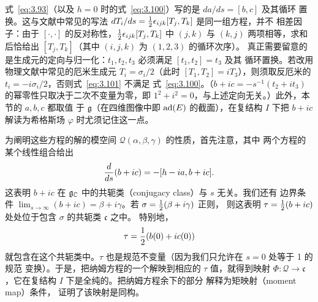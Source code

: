 \begin{yizhu}[易错点]
式~\eqref{eq:3.93}（以及 $h=0$ 时的式~\eqref{eq:3.100}）写的是 $da/ds=[b,c]$ 及其循环
置换。这与文献中常见的写法 $dT_i/ds=\frac{1}{2}\epsilon_{ijk}[T_j,T_k]$ 是同一组方程，并不
相差因子：由于 $[\cdot,\cdot]$ 的反对称性，$\frac{1}{2}\epsilon_{ijk}[T_j,T_k]$ 中 $(j,k)$ 与
$(k,j)$ 两项相等，求和后恰给出 $[T_j,T_k]$（其中 $(i,j,k)$ 为 $(1,2,3)$ 的循环次序）。
真正需要留意的是生成元的定向与归一化：$t_1,t_2,t_3$ 必须满足 $[t_1,t_2]=t_3$ 及其
循环置换。若改用物理文献中常见的厄米生成元 $T_i=\sigma_i/2$（此时
$[T_1,T_2]=iT_3$），则须取反厄米的 $t_i=-i\sigma_i/2$，否则式~\eqref{eq:3.101} 不满足
式~\eqref{eq:3.100}。（$b+ic=-s^{-1}(t_2+it_3)$ 的幂零性只取决于二次不变量为零，即
$1^2+i^2=0$，与上述定向无关。）此外，本节的 $a,b,c$ 都取值
于 $\mathfrak g$（在四维图像中即 ${\rm ad}(E)$ 的截面），在复结构 $I$ 下把 $b+ic$
解读为希格斯场 $\varphi$ 时尤须记住这一点。
\end{yizhu}

为阐明这些方程的解的模空间 ${\mathcal Q}(\alpha,\beta,\gamma)$ 的性质，首先注意，其中
两个方程的某个线性组合给出
\setcounter{equation}{93}
\begin{equation}\label{eq:3.94}
  {d\over ds}(b+ic)=-[h-ia,b+ic].
\end{equation}
这表明 $b+ic$ 在 $\mathfrak g_{\mathbb{C}}$ 中的共轭类（conjugacy class）与 $s$ 无关。我们还有
边界条件 $\lim_{s\to\infty}(b+ic)=\beta+i\gamma$。若 $\sigma=\frac{1}{2}(\beta+i\gamma)$ 正则，
则这表明 $\tau=\frac{1}{2}(b+ic)$ 处处位于包含 $\sigma$ 的共轭类 $\mathfrak c$ 之中。
特别地，
\setcounter{equation}{94}
\begin{equation}\label{eq:3.95}
  \tau=\frac{1}{2}(b(0)+ic(0))
\end{equation}
就包含在这个共轭类中。$\tau$ 也是规范不变量（因为我们只允许在 $s=0$ 处等于 1 的规范
变换）。于是，把纳姆方程的一个解映到相应的 $\tau$ 值，就得到映射
$\Phi:{\mathcal Q}\to \mathfrak c$，它在复结构 $I$ 下是全纯的。把纳姆方程余下的部分
解释为矩映射（moment map）条件，\cite{ref34} 证明了该映射是同构。

